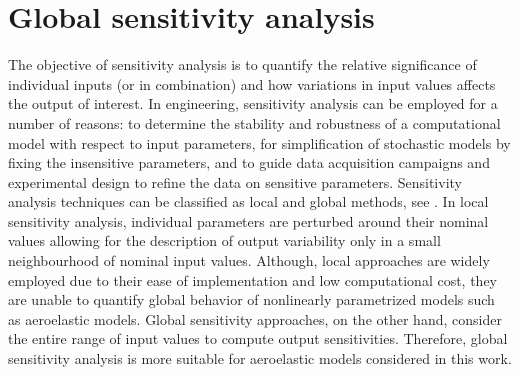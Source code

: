 \documentclass[review]{elsarticle}
\numberwithin{equation}{section}
\numberwithin{equation}{section}
\begin{document}
\section{Global sensitivity analysis}\label{sec:GSA}
The objective of sensitivity analysis is to quantify the relative significance of individual inputs (or in combination) and how variations in input values affects the output of interest. In engineering, sensitivity analysis can be employed for a number of reasons: to determine the stability and robustness of a computational model with respect to input parameters, for simplification of stochastic models by fixing the insensitive parameters, and to guide data acquisition campaigns and experimental design to refine the data on sensitive parameters. Sensitivity analysis techniques can be classified as local and global methods, see \cite{RSmith}. In local sensitivity analysis, individual parameters are perturbed around their nominal values allowing for the description of output variability only in a small neighbourhood of nominal input values. Although, local approaches are widely employed due to their ease of implementation and low computational cost, they are unable to quantify global behavior of nonlinearly parametrized models such as aeroelastic models. Global sensitivity approaches, on the other hand, consider the entire range of input values to compute output sensitivities. Therefore, global sensitivity analysis is more suitable for aeroelastic models considered in this work.  
\end{document}
